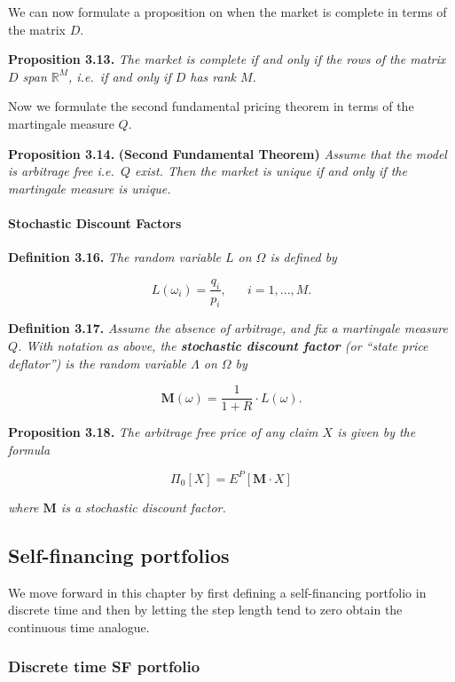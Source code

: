 \documentclass[
]{article}
\begin{document}
We can now formulate a proposition on when the market is complete in
terms of the matrix \(D\).

\textbf{Proposition 3.13.} \emph{The market is complete if and only if
the rows of the matrix \(D\) span \(\mathbb{R}^M\), i.e.~if and only if
\(D\) has rank \(M\).}

Now we formulate the second fundamental pricing theorem in terms of the
martingale measure \(Q\).

\textbf{Proposition 3.14.} \textbf{(Second Fundamental Theorem)}
\emph{Assume that the model is arbitrage free i.e.~\(Q\) exist. Then the
market is unique if and only if the martingale measure is unique.}

\hypertarget{stochastic-discount-factors}{%
\paragraph{Stochastic Discount
Factors}\label{stochastic-discount-factors}}

\textbf{Definition 3.16.} \emph{The random variable \(L\) on \(\Omega\)
is defined by}

\[
L(\omega_i)=\frac{q_i}{p_i},\hspace{20pt} i=1,...,M.
\]

\textbf{Definition 3.17.} \emph{Assume the absence of arbitrage, and fix
a martingale measure \(Q\). With notation as above, the
\textbf{stochastic discount factor} (or ``state price deflator'') is the
random variable \(\Lambda\) on \(\Omega\) by}

\[
\mathbf{M}(\omega)=\frac{1}{1+R}\cdot L(\omega).\tag{3.19}
\]

\textbf{Proposition 3.18.} \emph{The arbitrage free price of any claim
\(X\) is given by the formula}

\[
\Pi_0[X]=E^P[\mathbf{M}\cdot X]\tag{3.20}
\]

\emph{where \(\mathbf{M}\) is a stochastic discount factor.}

\hypertarget{self-financing-portfolios}{%
\subsection{Self-financing portfolios}\label{self-financing-portfolios}}

We move forward in this chapter by first defining a self-financing
portfolio in discrete time and then by letting the step length tend to
zero obtain the continuous time analogue.

\hypertarget{discrete-time-sf-portfolio}{%
\subsubsection{Discrete time SF
portfolio}\label{discrete-time-sf-portfolio}}
\end{document}

